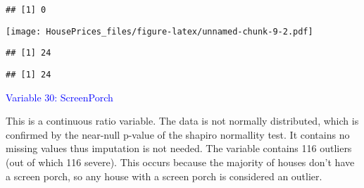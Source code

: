 \documentclass[
]{article}
\newenvironment{Shaded}{\begin{snugshade}}{\end{snugshade}}
\newcommand{\AttributeTok}[1]{\textcolor[rgb]{0.13,0.29,0.53}{#1}}
\newcommand{\CommentTok}[1]{\textcolor[rgb]{0.56,0.35,0.01}{\textit{#1}}}
\newcommand{\ConstantTok}[1]{\textcolor[rgb]{0.56,0.35,0.01}{#1}}
\newcommand{\DecValTok}[1]{\textcolor[rgb]{0.00,0.00,0.81}{#1}}
\newcommand{\FloatTok}[1]{\textcolor[rgb]{0.00,0.00,0.81}{#1}}
\newcommand{\FunctionTok}[1]{\textcolor[rgb]{0.13,0.29,0.53}{\textbf{#1}}}
\newcommand{\NormalTok}[1]{#1}
\newcommand{\OtherTok}[1]{\textcolor[rgb]{0.56,0.35,0.01}{#1}}
\newcommand{\SpecialCharTok}[1]{\textcolor[rgb]{0.81,0.36,0.00}{\textbf{#1}}}
\begin{document}
\begin{verbatim}
## [1] 0
\end{verbatim}

\begin{Shaded}
\end{Shaded}

\texttt{[image: HousePrices\_files/figure-latex/unnamed-chunk-9-2.pdf]}

\begin{verbatim}
## [1] 24
\end{verbatim}

\begin{Shaded}
\end{Shaded}

\begin{verbatim}
## [1] 24
\end{verbatim}

\textcolor{blue}{Variable 30: ScreenPorch}

This is a continuous ratio variable. The data is not normally
distributed, which is confirmed by the near-null p-value of the shapiro
normallity test. It contains no missing values thus imputation is not
needed. The variable contains 116 outliers (out of which 116 severe).
This occurs because the majority of houses don't have a screen porch, so
any house with a screen porch is considered an outlier.

\begin{Shaded}
\end{Shaded}
\end{document}
